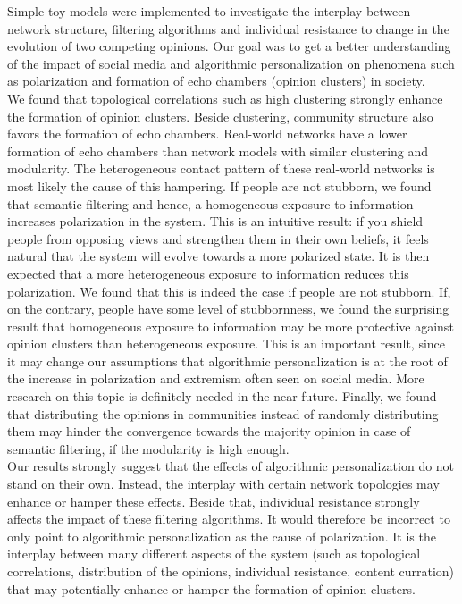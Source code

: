 \documentclass[11 pt , letterpaper , twoside , openright]{book}
\begin{document}
Simple toy models were implemented to investigate the interplay between network structure, filtering algorithms and individual resistance to change in the evolution of two competing opinions. Our goal was to get a better understanding of the impact of social media and algorithmic personalization on phenomena such as polarization and formation of echo chambers (opinion clusters) in society. \\
\newline
We found that topological correlations such as high clustering strongly enhance the formation of opinion clusters. Beside clustering, community structure also favors the formation of echo chambers. Real-world networks have a lower formation of echo chambers than network models with similar clustering and modularity. The heterogeneous contact pattern of these real-world networks is most likely the cause of this hampering. If people are not stubborn, we found that semantic filtering and hence, a homogeneous exposure to information increases polarization in the system. This is an intuitive result: if you shield people from opposing views and strengthen them in their own beliefs, it feels natural that the system will evolve towards a more polarized state. It is then expected that a more heterogeneous exposure to information reduces this polarization. We found that this is indeed the case if people are not stubborn. If, on the contrary, people have some level of stubbornness, we found the surprising result that homogeneous exposure to information may be more protective against opinion clusters than heterogeneous exposure. This is an important result, since it may change our assumptions that algorithmic personalization is at the root of the increase in polarization and extremism often seen on social media. More research on this topic is definitely needed in the near future. Finally, we found that distributing the opinions in communities instead of randomly distributing them may hinder the convergence towards the majority opinion in case of semantic filtering, if the modularity is high enough.\\
\newline
Our results strongly suggest that the effects of algorithmic personalization do not stand on their own. Instead, the interplay with certain network topologies may enhance or hamper these effects. Beside that, individual resistance strongly affects the impact of these filtering algorithms. It would therefore be incorrect to only point to algorithmic personalization as the cause of polarization. It is the interplay between many different aspects of the system (such as topological correlations, distribution of the opinions, individual resistance, content curration) that may potentially enhance or hamper the formation of opinion clusters.
\newpage
\end{document}
